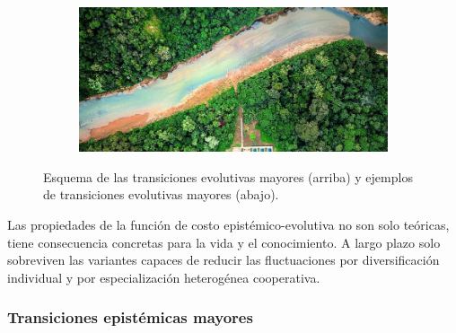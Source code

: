 \documentclass[a4paper,11pt]{book}
\theoremstyle{definition}
\newif\ifen
\newif\ifes
\newcommand{\En}[1]{\ifen#1\fi}
\newcommand{\Es}[1]{\ifes#1\fi}
\begin{document}
\begin{figure}[ht!]
\begin{subfigure}[b]{0.235\textwidth}
  \caption*{\En{Societies}}
 \end{subfigure}
 \begin{subfigure}[b]{0.235\textwidth} \centering
 \includegraphics[width=\linewidth]{static/tsimane2.jpg}
  \caption*{\En{Ecosystems}}
 \end{subfigure}
 \caption{
Esquema de las transiciones evolutivas mayores (arriba) y ejemplos de transiciones evolutivas mayores (abajo).
 }
 \label{fig:trans}
 \vspace{-0.3cm}
 \end{figure}

Las propiedades de la funci\'on de costo epist\'emico-evolutiva no son solo te\'oricas, tiene consecuencia concretas para la vida y el conocimiento.
%
A largo plazo solo sobreviven las variantes capaces de reducir las fluctuaciones por diversificaci\'on individual y por especializaci\'on heterog\'enea cooperativa.


\subsubsection{Transiciones epist\'emicas mayores}




%
%
%
\end{document}

